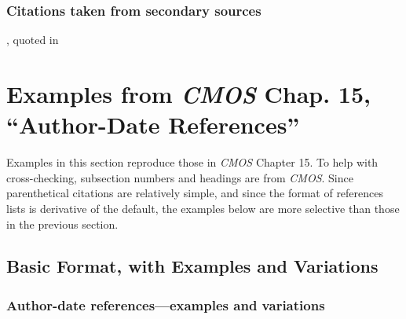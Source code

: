 \documentclass[11pt,letterpaper,oneside]{article}
\begin{document}
\begin{citebib}
\item \cite{iizuka1986}
\end{citebib}

\setcounter{subsubsection}{259}
\subsubsection{Citations taken from secondary sources}

\begin{citebib}
\item \cite[269]{zukofsky1931}, quoted in \cite[78]{costello1981}
\end{citebib}

\section{Examples from \emph{CMOS} Chap. 15, ``Author-Date
References''}
\label{paren}

Examples in this section reproduce those in \textit{CMOS} Chapter 15.
To help with cross-checking, subsection numbers and headings are from
\textit{CMOS}. Since parenthetical citations are relatively simple,
and since the format of references lists is derivative of the default,
the examples below are more selective than those in the previous
section.

\subsection{Basic Format, with Examples and Variations}
\setcounter{subsection}{15}

\setcounter{subsubsection}{8}
\subsubsection{Author-date references—examples and variations}
\label{15.9}

\begin{citeref}
\item \parencite[87--88]{strayed2012}
\item \parencite[32]{daum2015}
\item \parencite[188]{grazer2015}
\item \parencite[242--55]{garcia1988}
\item \parencite[310]{gould1984a}
\item \parencite[484--85]{bagley2015}
\item \parencite[312]{liu2015}
\end{citeref}
\end{document}
